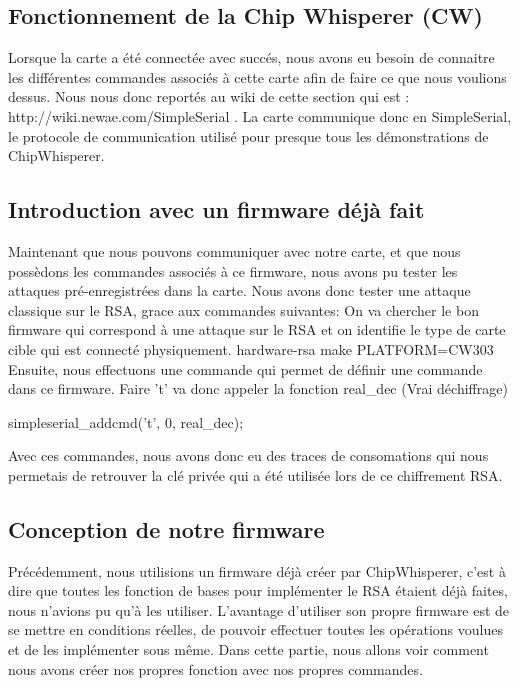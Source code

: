 \subsection{Fonctionnement de la Chip Whisperer (CW)}
Lorsque la carte a été connectée avec succés, nous avons eu besoin de connaitre les différentes commandes associés à cette carte afin de faire ce que nous voulions dessus.
Nous nous donc reportés au wiki de cette section qui est : http://wiki.newae.com/SimpleSerial .
La carte communique donc en SimpleSerial, le protocole de communication utilisé pour presque tous les démonstrations de ChipWhisperer.

\subsection{Introduction avec un firmware déjà fait}
Maintenant que nous pouvons communiquer avec notre carte, et que nous possèdons les commandes associés à ce firmware, nous avons pu tester les attaques pré-enregistrées dans la carte. 
Nous avons donc tester une attaque classique sur le RSA, grace aux commandes suivantes: 
On va chercher le bon firmware qui correspond à une attaque sur le RSA et on identifie le type de carte cible qui est connecté physiquement.
hardware\victims\firmware\simpleserial-rsa
make PLATFORM=CW303
Ensuite, nous effectuons une commande qui permet de définir une commande dans ce firmware. Faire 't' va donc appeler la fonction real_dec (Vrai déchiffrage)

simpleserial_addcmd('t', 0,  real_dec);

Avec ces commandes, nous avons donc eu des traces de consomations qui nous permetais de retrouver la clé privée qui a été utilisée lors de ce chiffrement RSA.
\subsection{Conception de notre firmware}
Précédemment, nous utilisions un firmware déjà créer par ChipWhisperer, c'est à dire que toutes les fonction de bases pour implémenter le RSA étaient déjà faites, nous n'avions pu qu'à les utiliser. L'avantage d'utiliser son propre firmware est de se mettre en conditions réelles, de pouvoir effectuer toutes les opérations voulues et de les implémenter sous même.
Dans cette partie, nous allons voir comment nous avons créer nos propres fonction avec nos propres commandes.


